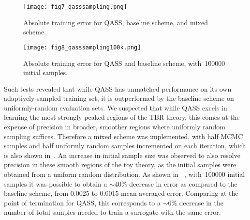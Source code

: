 \begin{figure}
	\centering
	\hspace*{-1.4em}\texttt{[image: fig7\_qasssampling.png]}
	\caption{\label{fig:qasssampling}Absolute training error for QASS, baseline scheme, and mixed scheme.}
\end{figure}

\begin{figure}
	\centering
	\hspace*{-1.4em}\texttt{[image: fig8\_qasssampling100k.png]}
	\caption{\label{fig:qasssampling100k}Absolute training error for QASS and
	baseline scheme, with~\num{100000} initial samples.}
\end{figure}

Such tests revealed that while QASS has unmatched performance on its own
adaptively-sampled training set, it is outperformed by the baseline scheme on
uniformly-random evaluation sets. We suspected that while QASS excels in
learning the most strongly peaked regions of the TBR theory, this comes at the
expense of precision in broader, smoother regions where uniformly random
sampling suffices. Therefore a mixed scheme was implemented, with half MCMC
samples and half uniformly random samples incremented on each iteration, which
is also shown in~. An increase in initial sample size was
observed to also resolve precision in these smooth regions of the toy theory, as
the initial samples were obtained from a uniform random distribution. As shown
in ~, with~\num{100000} initial samples it was
possible to obtain a ${\sim}40\%$ decrease in error as compared to the baseline
scheme, from 0.0025 to 0.0015 mean averaged error. Comparing at the point of
termination for QASS, this corresponds to a ${\sim}6\%$ decrease in the number
of total samples needed to train a surrogate with the same error. 


